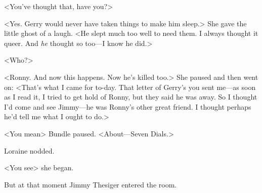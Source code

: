 <You've thought that, have you?>

<Yes. Gerry would never have taken things to make him sleep.> She gave the little ghost of a laugh. <He slept much too well to need them. I always thought it queer. And \emph{he} thought so too—I know he did.>

<Who?>

<Ronny. And now this happens. Now he's killed too.> She paused and then went on: <That's what I came for to-day. That letter of Gerry's you sent me—as soon as I read it, I tried to get hold of Ronny, but they said he was away. So I thought I'd come and see Jimmy—he was Ronny's other great friend. I thought perhaps he'd tell me what I ought to do.>

<You mean\longdash> Bundle paused. <About—Seven Dials.>

Loraine nodded.

<You see\longdash> she began.

But at that moment Jimmy Thesiger entered the room.
